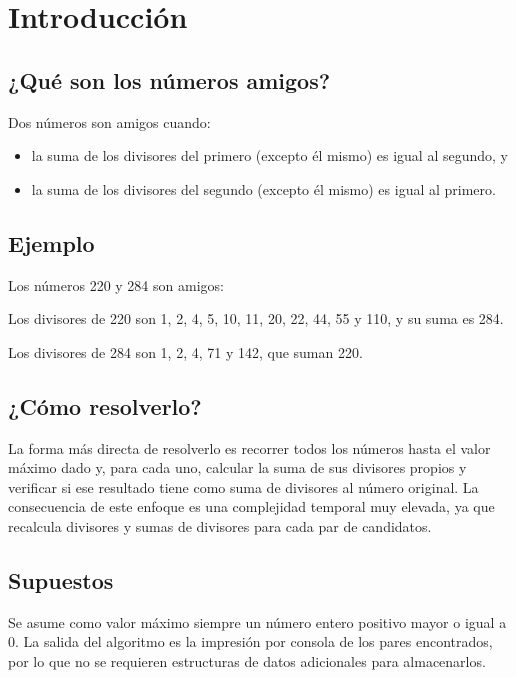 \section{Introducción}

    \subsection{¿Qué son los números amigos?}
    Dos números son amigos cuando:
    \begin{itemize}
        \item la suma de los divisores del primero (excepto él mismo) es igual al segundo, y
        \item la suma de los divisores del segundo (excepto él mismo) es igual al primero.
    \end{itemize}

        \subsection{Ejemplo}
            Los números 220 y 284 son amigos:

            Los divisores de 220 son 1, 2, 4, 5, 10, 11, 20, 22, 44, 55 y 110, y su suma es 284.

            Los divisores de 284 son 1, 2, 4, 71 y 142, que suman 220.

        \subsection{¿Cómo resolverlo?}
            La forma más directa de resolverlo es recorrer todos los números hasta el valor máximo
            dado y, para cada uno, calcular la suma de sus divisores propios y verificar si ese
            resultado tiene como suma de divisores al número original.
            La consecuencia de este enfoque es una complejidad temporal muy elevada, ya que
            recalcula divisores y sumas de divisores para cada par de candidatos.

        \subsection{Supuestos}
            Se asume como valor máximo siempre un número entero positivo mayor o igual a 0.
            La salida del algoritmo es la impresión por consola de los pares encontrados,
            por lo que no se requieren estructuras de datos adicionales para almacenarlos.

